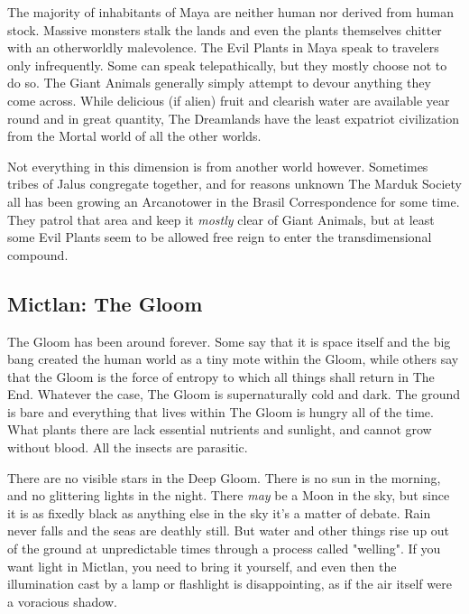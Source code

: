The majority of inhabitants of Maya are neither human nor derived from human stock. Massive monsters stalk the lands and even the plants themselves chitter with an otherworldly malevolence. The Evil Plants in Maya speak to travelers only infrequently. Some can speak telepathically, but they mostly choose not to do so. The Giant Animals generally simply attempt to devour anything they come across. While delicious (if alien) fruit and clearish water are available year round and in great quantity, The Dreamlands have the least expatriot civilization from the Mortal world of all the other worlds.

Not everything in this dimension is from another world however. Sometimes tribes of Jalus congregate together, and for reasons unknown The Marduk Society all has been growing an Arcanotower in the Brasil Correspondence for some time. They patrol that area and keep it \textit{mostly} clear of Giant Animals, but at least some Evil Plants seem to be allowed free reign to enter the transdimensional compound. 

\subsection{Mictlan: The Gloom} 

The Gloom has been around forever. Some say that it is space itself and the big bang created the human world as a tiny mote within the Gloom, while others say that the Gloom is the force of entropy to which all things shall return in The End. Whatever the case, The Gloom is supernaturally cold and dark.  The ground is bare and everything that lives within The Gloom is hungry all of the time. What plants there are lack essential nutrients and sunlight, and cannot grow without blood. All the insects are parasitic.

There are no visible stars in the Deep Gloom. There is no sun in the morning, and no glittering lights in the night. There \textit{may} be a Moon in the sky, but since it is as fixedly black as anything else in the sky it's a matter of debate. Rain never falls and the seas are deathly still. But water and other things rise up out of the ground at unpredictable times through a process called "welling". If you want light in Mictlan, you need to bring it yourself, and even then the illumination cast by a lamp or flashlight is disappointing, as if the air itself were a voracious shadow.

